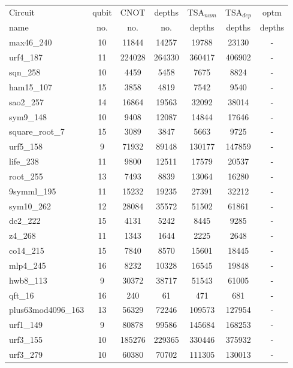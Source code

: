 \documentclass[journal]{IEEEtran}
\begin{document}
	\begin{table*}[!th]
		\begin{center}
			\begin{tabular}{|p{4.3cm}<{\centering}|c|c|c|c|c|c|}
				\hline
				Circuit &  qubit  & CNOT &depths &TSA$_{num}$& TSA$_{dep}$  & optm 	  	\\
				name	&   no. 	&	no. & no. & depths&  depths &  depths 	\\
				\hline
				max46\_240 & 10 & 11844 & 14257 & 19788 & 23130 & - \\ 
				urf4\_187 & 11 & 224028 & 264330 & 360417 & 406902 & - \\ 
				sqn\_258 & 10 & 4459 & 5458 & 7675 & 8824 & - \\ 
				ham15\_107 & 15 & 3858 & 4819 & 7542 & 9540 & - \\ 
				sao2\_257 & 14 & 16864 & 19563 & 32092 & 38014 & - \\ 
				sym9\_148 & 10 & 9408 & 12087 & 14844 & 17646 & - \\ 
				square\_root\_7 & 15 & 3089 & 3847 & 5663 & 9725 & - \\ 
				urf5\_158 & 9 & 71932 & 89148 & 130177 & 147859 & - \\ 
				life\_238 & 11 & 9800 & 12511 & 17579 & 20537 & - \\ 
				root\_255 & 13 & 7493 & 8839 & 13064 & 16280 & - \\ 
				9symml\_195 & 11 & 15232 & 19235 & 27391 & 32212 & - \\ 
				sym10\_262 & 12 & 28084 & 35572 & 51502 & 61861 & - \\ 
				dc2\_222 & 15 & 4131 & 5242 & 8445 & 9285 & - \\ 
				z4\_268 & 11 & 1343 & 1644 & 2225 & 2648 & - \\ 
				co14\_215 & 15 & 7840 & 8570 & 15601 & 18445 & - \\ 
				mlp4\_245 & 16 & 8232 & 10328 & 16545 & 19848 & - \\ 
				hwb8\_113 & 9 & 30372 & 38717 & 51543 & 61005 & - \\ 
				qft\_16 & 16 & 240 & 61 & 471 & 681 & - \\ 
				plus63mod4096\_163 & 13 & 56329 & 72246 & 109573 & 127954 & - \\ 
				urf1\_149 & 9 & 80878 & 99586 & 145684 & 168253 & - \\ 
				urf3\_155 & 10 & 185276 & 229365 & 330446 & 375932 & - \\ 
				urf3\_279 & 10 & 60380 & 70702 & 111305 & 130013 & - \\ 

\end{tabular}
\end{center}
\end{table*}
\end{document}
